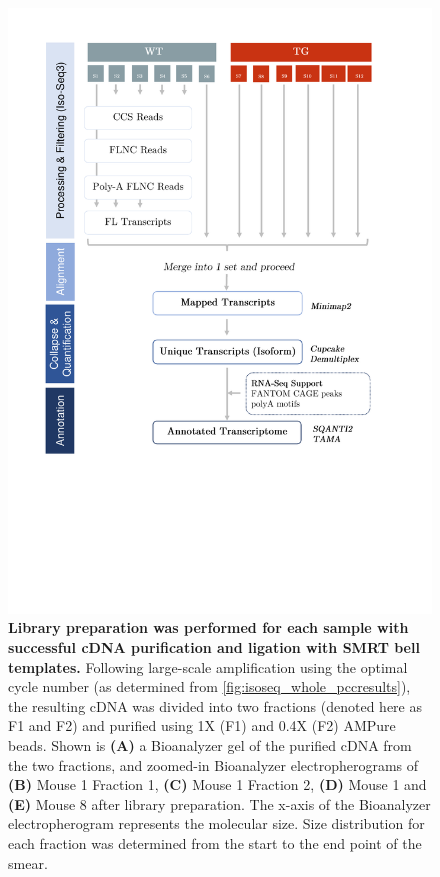 \begin{figure}[!htp]
	\centering
	\vspace{20pt}
	\includegraphics[page=3,trim={1cm 12cm 0 0cm},clip,scale = 0.8]{Figures/WholeTranscriptome_Figures.pdf}
	\captionsetup{width=0.95\textwidth}
	\caption[Iso-Seq global transcript profiling - SMRTbell library preparation]%
	{\textbf{Library preparation was performed for each sample with successful cDNA purification and ligation with SMRT bell templates.} Following large-scale amplification using the optimal cycle number (as determined from \cref{fig:isoseq_whole_pccresults}), the resulting cDNA was divided into two fractions (denoted here as F1 and F2) and purified using 1X (F1) and 0.4X (F2) AMPure beads. Shown is \textbf{(A)} a Bioanalyzer gel of the purified cDNA from the two fractions, and zoomed-in Bioanalyzer electropherograms of \textbf{(B)} Mouse 1 Fraction 1, \textbf{(C)} Mouse 1 Fraction 2, \textbf{(D)} Mouse 1 and \textbf{(E)} Mouse 8 after library preparation. The x-axis of the Bioanalyzer electropherogram represents the molecular size. Size distribution for each fraction was determined from the start to the end point of the smear. 
}
\end{figure}
